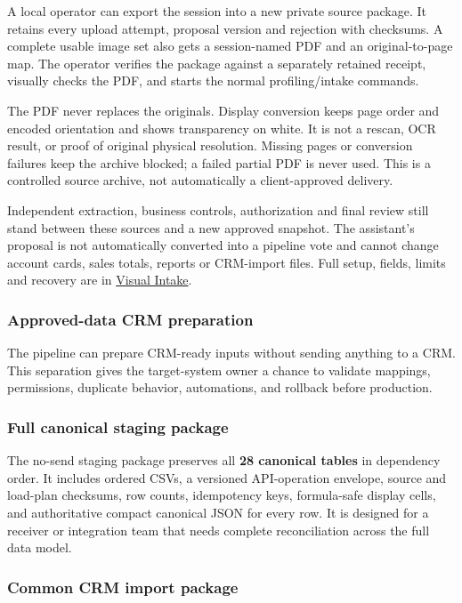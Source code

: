 \documentclass[
]{article}
\begin{document}
A local operator can export the session into a new private source
package. It retains every upload attempt, proposal version and rejection
with checksums. A complete usable image set also gets a session-named
PDF and an original-to-page map. The operator verifies the package
against a separately retained receipt, visually checks the PDF, and
starts the normal profiling/intake commands.

The PDF never replaces the originals. Display conversion keeps page
order and encoded orientation and shows transparency on white. It is not
a rescan, OCR result, or proof of original physical resolution. Missing
pages or conversion failures keep the archive blocked; a failed partial
PDF is never used. This is a controlled source archive, not
automatically a client-approved delivery.

Independent extraction, business controls, authorization and final
review still stand between these sources and a new approved snapshot.
The assistant's proposal is not automatically converted into a pipeline
vote and cannot change account cards, sales totals, reports or
CRM-import files. Full setup, fields, limits and recovery are in
\href{../references/visual-ingestion.md}{Visual Intake}.

\subsubsection{Approved-data CRM
preparation}\label{approved-data-crm-preparation}

The pipeline can prepare CRM-ready inputs without sending anything to a
CRM. This separation gives the target-system owner a chance to validate
mappings, permissions, duplicate behavior, automations, and rollback
before production.

\subsubsection{Full canonical staging
package}\label{full-canonical-staging-package}

The no-send staging package preserves all \textbf{28 canonical tables}
in dependency order. It includes ordered CSVs, a versioned API-operation
envelope, source and load-plan checksums, row counts, idempotency keys,
formula-safe display cells, and authoritative compact canonical JSON for
every row. It is designed for a receiver or integration team that needs
complete reconciliation across the full data model.

\subsubsection{Common CRM import
package}\label{common-crm-import-package}
\end{document}
